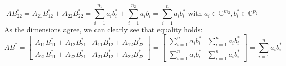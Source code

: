 \documentclass[12pt]{article}
\numberwithin{equation}{section}
\begin{document}
\begin{enumerate}
    $$AB^*_{22}=A_{21}B_{12}^*+A_{22}B_{22}^*=\sum_{i=1}^{n_1}a_ib_i^*+\sum_{i=1}^{n_2}a_ib_i=\sum_{i=1}^n a_ib_i^*\text{ with }a_i\in \mathbb{C}^{m_2},b^*_i\in \mathbb{C}^{p_2}$$
    As the dimensions agree, we can clearly see that equality holds:
    $$AB^*=\left[\begin{array}{c|c} A_{11}B_{11}^*+A_{12}B_{21}^* & A_{11}B_{12}^* +A_{12}B_{22}^*\\ \hline A_{21}B_{11}^*+A_{22}B_{21}^* & A_{21}B_{12}^*+A_{22}B_{22}^*\end{array}\right]=\left[\begin{array}{c|c}\sum_{i=1}^n a_ib_i^* &\sum_{i=1}^n a_ib_i^*\\ \hline \sum_{i=1}^n a_ib_i^* &\sum_{i=1}^n a_ib_i^*\end{array}\right]=\sum_{i=1}^n a_ib_i^*$$



\end{enumerate}
\end{document}
